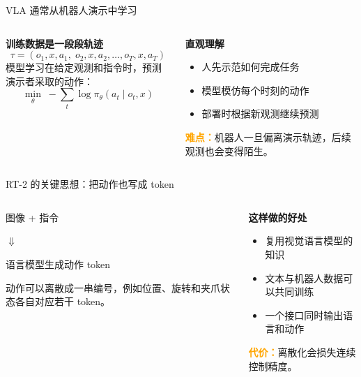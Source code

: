 \documentclass[aspectratio=169,11pt]{ctexbeamer}
\newcommand{\orangebold}[1]{\textcolor{Orange}{\textbf{#1}}}
\newcommand{\insertframesource}{}
\newcommand{\setsource}[1]{\gdef\insertframesource{#1}}
\begin{document}
\setsource{Refs.: [1] A. Brohan \emph{et al.}, ``RT-1: Robotics Transformer for Real-World Control at Scale,'' arXiv:2212.06817, 2022. [2] A. Brohan \emph{et al.}, \emph{Proc. CoRL}, 2023.}
\begin{frame}{VLA 通常从机器人演示中学习}
\begin{columns}[c,onlytextwidth]
\begin{column}{0.55\textwidth}
\textbf{训练数据是一段段轨迹}
\[\tau=(o_1,x,a_1,\;o_2,x,a_2,\ldots,o_T,x,a_T)\]
模型学习在给定观测和指令时，预测演示者采取的动作：
\[\min_\theta\; -\sum_t \log \pi_\theta(a_t\mid o_t,x)\]
\end{column}
\begin{column}{0.39\textwidth}
\textbf{直观理解}
\begin{itemize}\item 人先示范如何完成任务\item 模型模仿每个时刻的动作\item 部署时根据新观测继续预测\end{itemize}
\vspace{0.24cm}\orangebold{难点：}机器人一旦偏离演示轨迹，后续观测也会变得陌生。
\end{column}
\end{columns}
\end{frame}

\setsource{Ref.: [1] A. Brohan \emph{et al.}, ``RT-2: Vision-Language-Action Models Transfer Web Knowledge to Robotic Control,'' in \emph{Proc. CoRL}, 2023, pp. 2165--2183.}
\begin{frame}{RT-2 的关键思想：把动作也写成 token}
\vspace{0.16cm}
\begin{columns}[c,onlytextwidth]
\begin{column}{0.56\textwidth}
{\fontsize{19}{24}\selectfont\begin{center}图像 + 指令\vspace{0.12cm}\par $\Downarrow$\vspace{0.12cm}\par 语言模型生成动作 token\end{center}}
\vspace{0.20cm}动作可以离散成一串编号，例如位置、旋转和夹爪状态各自对应若干 token。
\end{column}
\begin{column}{0.38\textwidth}
\textbf{这样做的好处}
\begin{itemize}\item 复用视觉语言模型的知识\item 文本与机器人数据可以共同训练\item 一个接口同时输出语言和动作\end{itemize}
\vspace{0.20cm}\orangebold{代价：}离散化会损失连续控制精度。
\end{column}
\end{columns}
\end{frame}
\end{document}
